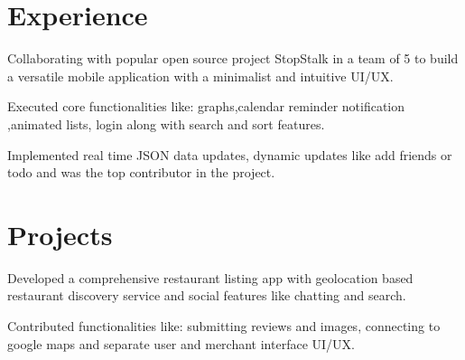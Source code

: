 \documentclass{deedy-resume-openfont}
\begin{document}
\hfill
\begin{minipage}[t]{0.66\textwidth} 

\section{Experience}
\vspace{1mm}
\vspace{\topsep} %
\begin{tightemize}
{\justifying
\item Collaborating with popular open source project StopStalk in a team of 5 to build a versatile mobile application with a minimalist and intuitive UI/UX. 
\item Executed core functionalities like: graphs,calendar reminder notification ,animated lists, login along with search and sort features. 
\item Implemented real time JSON data updates, dynamic updates like add friends or todo and was the top contributor in the project.
\par}
\end{tightemize}
\sectionsep

\sectionsep
\section{Projects}
\vspace{1mm}
\begin{tightemize}
{\justifying
\item Developed a comprehensive restaurant listing app with geolocation based restaurant discovery service and social features like chatting and search.
\item Contributed functionalities like: submitting reviews and images, connecting to google maps and separate user and merchant interface UI/UX.
\par}
\end{tightemize}
\sectionsep


\end{minipage}
\end{document}
